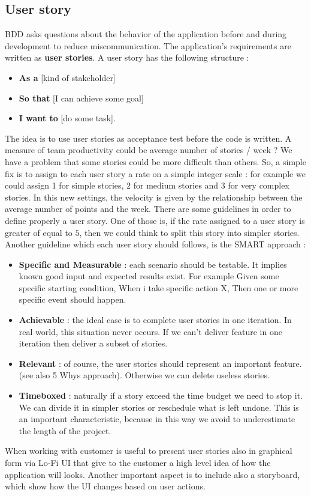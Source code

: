 \documentclass[11pt]{article}
\begin{document}
\begin{appendix}
\section{User story}
BDD asks questions about the behavior of the application before and during development to reduce miscommunication. The application's requirements are written as \textbf{user stories}. A user story has the following structure :
\begin{itemize}
\item \textbf{As a} [kind of stakeholder]
\item \textbf{So that} [I can achieve some goal]
\item \textbf{I want to} [do some task].
\end{itemize}
The idea is to use user stories as acceptance test before the code is written. A measure of team productivity could be average number of stories / week ? We have a problem that some stories could be more difficult than others. So, a simple fix is to assign to each user story a rate on a simple integer scale : for example we could assign 1 for simple stories, $2$ for medium stories and $3$ for very complex stories. In this new settings, the velocity is given by the relationship between the average number of points and the week. There are some guidelines in order to define properly a user story. One of those is, if the rate assigned to a user story is greater of equal to $5$, then we could think to split this story into simpler stories. Another guideline which each user story should follows, is the SMART approach :
\begin{itemize}
\item \textbf{Specific and Measurable} : each scenario should be testable. It implies known good input and expected results exist. For example Given some specific starting condition, When i take specific action X, Then one or more specific event should happen.
\item \textbf{Achievable} : the ideal case is to complete user stories in one iteration. In real world, this situation never occurs. If we can't deliver feature in one iteration then deliver a subset of stories.
\item \textbf{Relevant} : of course, the user stories should represent an important feature. (see also 5 Whys approach). Otherwise we can delete useless stories.
\item \textbf{Timeboxed} : naturally if a story exceed the time budget we need to stop it. We can divide it in simpler stories or reschedule what is left undone. This is an important characteristic, because in this way we avoid to underestimate the length of the project.
\end{itemize}
When working with customer is useful to present user stories also in graphical form via Lo-Fi UI that give to the customer a high level idea of how the application will looks. Another important aspect is to include also a storyboard, which show how the UI changes based on user actions.

\end{appendix}
\end{document}
